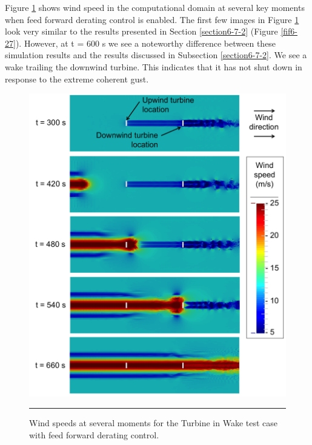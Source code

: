 Figure \ref{fig6-33} shows wind speed in the computational domain at several key moments when feed forward derating control is enabled. The first few images in Figure \ref{fig6-33} look very similar to the results presented in Section \ref{section6-7-2} (Figure \ref{fif6-27}). However, at t = 600 s we see a noteworthy difference between these simulation results and the results discussed in Subsection \ref{section6-7-2}. We see a wake trailing the downwind turbine. This indicates that it has not shut down in response to the extreme coherent gust.

 \begin{figure}[htbp] \label{fig6-33} 
	\centering
		\includegraphics[width = \linewidth]{Figures/ch6Figures/fig6-33.png}
		\rule{35em}{0.5pt}
	\caption{Wind speeds at several moments for the Turbine in Wake test case with feed forward derating control.}
\end{figure}

